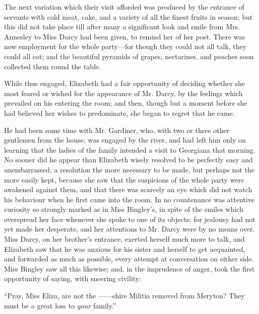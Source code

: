 The next variation which their visit afforded was produced by the entrance of servants with cold meat, cake, and a variety of all the finest fruits in season; but this did not take place till after many a significant look and smile from Mrs. Annesley to Miss Darcy had been given, to remind her of her post. There was now employment for the whole party---for though they could not all talk, they could all eat; and the beautiful pyramids of grapes, nectarines, and peaches soon collected them round the table.

While thus engaged, Elizabeth had a fair opportunity of deciding whether she most feared or wished for the appearance of Mr. Darcy, by the feelings which prevailed on his entering the room; and then, though but a moment before she had believed her wishes to predominate, she began to regret that he came.

He had been some time with Mr. Gardiner, who, with two or three other gentlemen from the house, was engaged by the river, and had left him only on learning that the ladies of the family intended a visit to Georgiana that morning. No sooner did he appear than Elizabeth wisely resolved to be perfectly easy and unembarrassed; a resolution the more necessary to be made, but perhaps not the more easily kept, because she saw that the suspicions of the whole party were awakened against them, and that there was scarcely an eye which did not watch his behaviour when he first came into the room. In no countenance was attentive curiosity so strongly marked as in Miss Bingley's, in spite of the smiles which overspread her face whenever she spoke to one of its objects; for jealousy had not yet made her desperate, and her attentions to Mr. Darcy were by no means over. Miss Darcy, on her brother's entrance, exerted herself much more to talk, and Elizabeth saw that he was anxious for his sister and herself to get acquainted, and forwarded as much as possible, every attempt at conversation on either side. Miss Bingley saw all this likewise; and, in the imprudence of anger, took the first opportunity of saying, with sneering civility:

“Pray, Miss Eliza, are not the ------shire Militia removed from Meryton? They must be a great loss to {\em your} family.”

